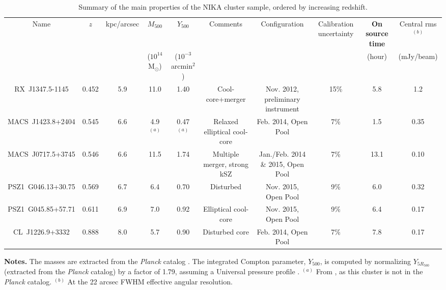 \documentclass[twocolumn,traditabstract]{aa}
\begin{document}
\begin{table}[]
\caption{\footnotesize{Summary of the main properties of the NIKA cluster sample, ordered by increasing redshift.}}
\begin{center}
\resizebox{\textwidth}{!} {
\begin{tabular}{c|c|c|c|c|c||c|c|c|c}
\hline
\hline
Name & $z$ & kpc/arcsec & $M_{500}$ & $Y_{500}$ & Comments & Configuration & Calibration uncertainty & {\bf On source time} & Central rms$^{(b)}$ \\
 &  & & ($10^{14}$ M$_{\odot}$)& ($10^{-3}$arcmin$^2$) & & & & (hour) & (mJy/beam) \\
\hline
RX~J1347.5-1145 & 0.452 & 5.9 & 11.0 & 1.40 & Cool-core+merger & Nov. 2012, preliminary instrument & 15\% & 5.8 & 1.2 \\ 
MACS~J1423.8+2404 & 0.545 & 6.6 & 4.9 $^{(a)}$ & 0.47 $^{(a)}$ & Relaxed elliptical cool-core & Feb. 2014, Open Pool & 7\% &1.5 & 0.35 \\ 
MACS~J0717.5+3745 & 0.546 & 6.6 & 11.5 & 1.74 & Multiple merger, strong kSZ & Jan./Feb. 2014 \& 2015, Open Pool & 7\% & 13.1 & 0.10 \\ 
PSZ1~G046.13+30.75 & 0.569 & 6.7 & 6.4 & 0.70 & Disturbed & Nov. 2015, Open Pool & 9\% & 6.0 &  0.32\\ 
PSZ1~G045.85+57.71 & 0.611 & 6.9 & 7.0 & 0.92 & Elliptical cool-core & Nov. 2015, Open Pool & 9\% & 6.4 & 0.17 \\ 
CL~J1226.9+3332 &  0.888 & 8.0 & 5.7 & 0.90 & Disturbed core & Feb. 2014, Open Pool & 7\% & 7.8 & 0.17 \\ 
\hline
\end{tabular}
}
\end{center}
{\small {\bf Notes.} The masses are extracted from the \textit{Planck} catalog \citep{PlanckXXVII2015}. The integrated Compton parameter, $Y_{500}$, is computed by normalizing $Y_{5R_{500}}$ (extracted from the \textit{Planck} catalog) by a factor of 1.79, assuming a Universal pressure profile \citep{Arnaud2010}. $^{(a)}$ From \cite{Adam2016a}, as this cluster is not in the \textit{Planck} catalog. $^{(b)}$ At the 22 arcsec FWHM effective angular resolution.}
\label{tab:cluster_summary}
\end{table}
\end{document}
